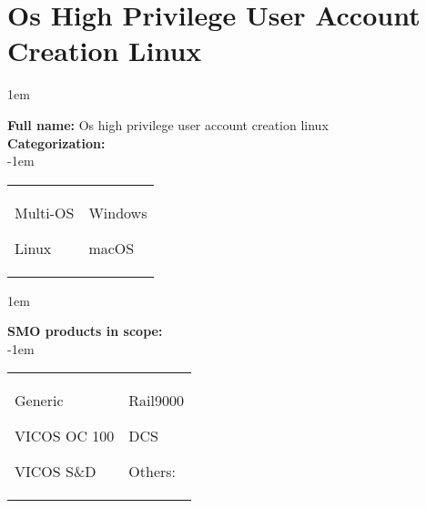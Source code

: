 
%
%

\section{Os High Privilege User Account Creation Linux}
\label{15671}

\openup 1em

\textbf{Full name:} Os high privilege user account creation linux\hrulefill \\
{\bf Categorization:} \\

\openup -1em
\vspace{-3em}

\begin{tabular}{p{}p{}}

\begin{todolist}
  	\item Multi-OS
	\item[\done] Linux
\end{todolist}
&
\begin{todolist}
	\item Windows
	\item macOS
\end{todolist}

\end{tabular}

\openup 1em

{\bf SMO products in scope:} \\

\openup -1em
\vspace{-3em}

\begin{tabular}{p{}p{}}

\begin{todolist}
  \item[\done] Generic
  \item VICOS OC 100
  \item VICOS S\&D
\end{todolist}
&
\begin{todolist}
  \item[\done] Rail9000
  \item DCS
  \item Others: \hrulefill
\end{todolist}

\end{tabular}

